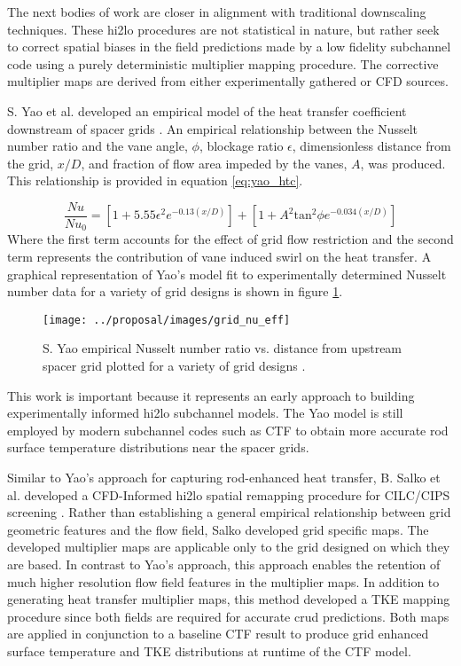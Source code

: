  The next bodies of work are closer in alignment with traditional downscaling techniques.  These hi2lo procedures are not statistical in nature, but rather seek to correct spatial biases in the field predictions made by a low fidelity subchannel code using a purely deterministic multiplier mapping procedure.  The corrective multiplier maps are derived from either experimentally gathered or CFD sources.
    
S. Yao et al. developed an empirical model of the heat transfer coefficient downstream of spacer grids \cite{yao82}.
    An empirical relationship between the Nusselt number ratio and the vane angle, $\phi$, blockage ratio $\epsilon$, dimensionless distance from the grid, $x/D$, and fraction of flow area impeded by the vanes, $A$, was produced.  This relationship is provided in equation \ref{eq:yao_htc}.
    
\begin{equation}
\frac{Nu}{Nu_0}  = \left[ 1 + 5.55 \epsilon^2 e^{-0.13(x/D)}\right] + \left[ 1 + A^2\mathrm{tan}^2\phi e^{-0.034(x/D)} \right]
\label{eq:yao_htc}
\end{equation}
Where the first term accounts for the effect of grid flow restriction and the second term represents the contribution of vane induced swirl on the heat transfer.
A graphical representation of Yao's model fit to experimentally determined Nusselt number data for a variety of grid designs is shown in figure \ref{fig:gridnueff}.
\begin{figure}[H]
    \centering
    \texttt{[image: ../proposal/images/grid\_nu\_eff]}
    \caption[S. Yao empirical Nusselt number ratio vs. distance from upstream spacer.]{S. Yao empirical Nusselt number ratio vs. distance from upstream spacer grid plotted for a variety of grid designs \cite{yao82}.}
    \label{fig:gridnueff}
\end{figure}
This work is important because it represents an early approach to building experimentally informed hi2lo subchannel models.  The Yao model is still employed by modern subchannel codes such as CTF to obtain more accurate rod surface temperature distributions near the spacer grids.

    Similar to Yao's approach for capturing rod-enhanced heat transfer,  B. Salko et al. developed a CFD-Informed hi2lo spatial remapping procedure for CILC/CIPS screening \cite{salko17}.  Rather than establishing a general empirical relationship between grid geometric features and the flow field, Salko developed grid specific maps.  The developed multiplier maps are applicable only to the grid designed on which they are based.  In contrast to Yao's approach, this approach enables the retention of much higher resolution flow field features in the multiplier maps.  In addition to generating heat transfer multiplier maps, this method developed a TKE mapping procedure since both fields are required for accurate crud predictions.  Both maps are applied in conjunction to a baseline CTF result to produce grid enhanced surface temperature and TKE distributions at runtime of the CTF model.
    
